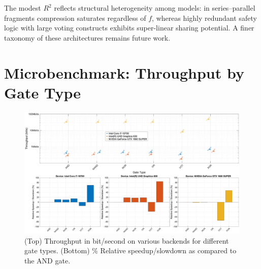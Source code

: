The modest $R^{2}$ reflects structural heterogeneity among models: in
series–parallel fragments compression saturates regardless of $f$,
whereas highly redundant safety logic with large voting constructs
exhibits super-linear sharing potential.  A finer taxonomy of these
architectures remains future work.


\section{Microbenchmark: Throughput by Gate Type}
\begin{figure}[hb]
    \centering
    \includegraphics[width=1\textwidth]{figs/kernel/slides_throughput_by_gate_type.eps}
    \caption{(Top) Throughput in bit/second on various backends for different gate types. (Bottom) \% Relative speedup/slowdown as compared to the AND gate.}
    \label{fig:gate_throughput}
\end{figure}